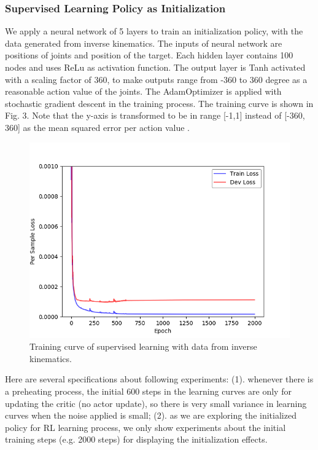 \documentclass{article}
\begin{document}
\subsubsection{Supervised Learning Policy as Initialization}
We apply a neural network of 5 layers to train an initialization policy, with the data generated from inverse kinematics. The inputs of neural network are positions of joints and position of the target.  Each hidden layer contains 100 nodes and uses ReLu as activation function. The output layer is Tanh activated with a scaling factor of 360, to make outputs range from -360 to 360 degree as a reasonable action value of the joints. The AdamOptimizer is applied with stochastic gradient descent in the training process. The training curve is shown in Fig. 3. Note that the y-axis is transformed to be in range [-1,1] instead of [-360, 360] as the mean squared error per action value .
\begin{figure}[htbp]
	\centering
	\includegraphics[scale=0.8]{img/supervised.png}
	\caption{Training curve of supervised learning with data from inverse kinematics.}
	\label{fig:universe}
\end{figure}

Here are several specifications about following experiments: (1). whenever there is a preheating process, the initial 600 steps in the learning curves are only for updating the critic (no actor update), so there is very small variance in learning curves when the noise applied is small; (2). as we are exploring the initialized policy for RL learning process, we only show experiments about the initial training steps (e.g. 2000 steps) for displaying the initialization effects.
\end{document}
